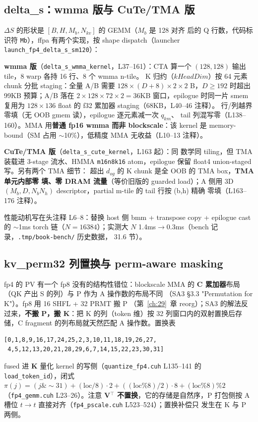 \subsection{delta\_s：wmma 版与 CuTe/TMA 版}

$\Delta S$ 的形状是 $[B,H,M_b,N_{kv}]$ 的 GEMM（$M_b$ 是 128 对齐
后的 Q 行数，代码标识符 \texttt{Mb}），ffpa 有两个实现，按 shape
dispatch（launcher
\texttt{launch\_fp4\_delta\_s\_sm120}）：

\textbf{wmma 版}（\texttt{delta\_s\_wmma\_kernel}，L37--161）：CTA
算一个 $(128,128)$ 输出 tile，8 warp 各持 16 行、8 个 wmma n-tile。
K 归约（$kHeadDim$）按 64 元素 chunk 分批 staging：全量 A/B 需要
$128\times(D{+}8)\times2\times2$ B，$D\ge192$ 时超出 99KB 预算；A/B 落在
$2\times128\times72\times2=36$KB 窗口，epilogue 时同一片 smem 复用为
$128\times136$ float 的 f32 累加器 staging（68KB，L40--46 注释）。
行/列越界零填（无 OOB gmem 读），epilogue 逐元素减一次 $q_{km}$、
tail 列混写零（L138--160）。MMA 用\textbf{普通 fp16 wmma 而非
blockscale}：该 kernel 是 memory-bound（SM 占用 $\sim$10\%），低精度
MMA 无收益（L10--13 注释）。

\textbf{CuTe/TMA 版}（\texttt{delta\_s\_cute\_kernel}，L163 起）：同
数学同 tiling，但 TMA 装载进 3-stage 流水、HMMA \texttt{m16n8k16}
atom，epilogue 保留 float4 union-staged 写。另有两个 TMA 细节：
超出 $d_{og}$ 的 K chunk 是全 OOB 的 TMA box，\textbf{TMA 单元内部零
填、零 DRAM 流量}（等价旧版的 guarded load）；A 侧用 3D
$(M_b,D,N_bN_h)$ descriptor，partial m-tile 的 tail 行按 (b,h) 精确
零填（L163--176 注释）。

性能动机写在头注释 L6--8：替换 host 侧 bmm + transpose copy +
epilogue cast 的 $\sim$1ms torch 链（$N{=}16384$）；实测大 $N$
1.4ms$\to$0.3ms（bench 记录，\texttt{.tmp/book-bench/} 历史数据，
31.6 节）。

\subsection{kv\_perm32 列置换与 perm-aware masking}

fp4 的 PV 有一个 fp8 没有的结构性错位：blockscale MMA 的
\textbf{C 累加器}布局（QK 产出 S 的列）与 P 作为 A 操作数的布局不同
（SA3 §3.3 "Permutation for K"）。fp8 用 16 SHFL + 32 PRMT 搬 P
（第~\ref{ch:29}~章 reorg）；SA3 的解法反过来，\textbf{不搬 P，搬
K}：把 K 的列（token 维）按 32 列窗口内的双射置换后存储，C fragment
的列布局就天然匹配 A 操作数。置换表
\begin{lstlisting}[style=console]
[0,1,8,9,16,17,24,25,2,3,10,11,18,19,26,27,
 4,5,12,13,20,21,28,29,6,7,14,15,22,23,30,31]
\end{lstlisting}
fused 进 \textbf{K} 量化 kernel 的写侧（\texttt{quantize\_fp4.cuh}
L135--141 的 \texttt{load\_token\_id}），闭式
$\pi(j)=(j\&\sim31)+(\mathrm{loc}/8)\cdot2+((\mathrm{loc}\%8)/2)\cdot8+
(\mathrm{loc}\%8)\%2$（\texttt{fp4\_gemm.cuh} L23--26）。注意
\textbf{V$^\top$ 不置换}，它的存储是自然序，P 打包侧按 A 槽位
$t\to t$ 直接对齐（\texttt{fp4\_pscale.cuh} L523--524）；置换补偿只
发生在 K 与 P 两侧。

